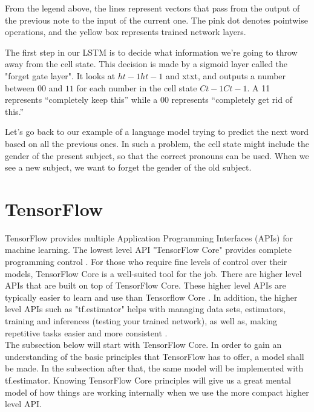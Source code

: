 From the legend above, the lines represent
vectors that pass from the output of the
previous note to the input of the current one.
The pink dot denotes pointwise operations, 
and the yellow box represents trained network
layers.

The first step in our LSTM is to decide what information we’re going to throw away from 
the cell state. This decision is made by a
sigmoid layer called the "forget gate layer".
It looks at $ht-1ht-1$ and xtxt, and outputs a number between $00$ and $11$ for each number
in the cell state $Ct-1Ct-1$. A 11 represents
“completely keep this” while a $00$ represents
“completely get rid of this.”

Let’s go back to our example of a language model trying to predict the next word based on all the previous ones. In such a problem, the cell state might include the gender of the present subject, so that the correct pronouns can be used. When we see a new subject, we want to forget the gender of the old subject.




\section{TensorFlow}
TensorFlow provides multiple Application Programming Interfaces
(APIs) for machine learning. 
The lowest level API "TensorFlow Core" provides complete programming control \cite{tensorflow2015-whitepaper}. 
For those who require fine levels of control over their models,
TensorFlow Core is a well-suited tool for the job. There are higher level APIs that are built on top of TensorFlow Core.
These higher level APIs are typically easier to learn and use than Tensorflow Core \cite{tensorflow2015-whitepaper}.
In addition, the higher level APIs such as "tf.estimator" helps with managing data sets, estimators,
training and inferences (testing your trained network),
as well as, making repetitive tasks easier and more consistent
\cite{tensorflow2015-whitepaper}.\\

The subsection below will start with TensorFlow Core. 
In order to gain an understanding of the basic principles that TensorFlow has to offer, a model shall be made. 
In the subsection after that, the same model will be implemented with tf.estimator. 
Knowing TensorFlow Core principles will give us a great mental model of how things are working internally when we use the more compact higher level API.

